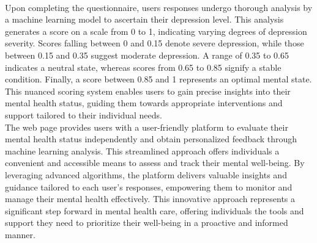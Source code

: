\\
Upon completing the questionnaire, users responses undergo thorough analysis by a machine learning model to ascertain their depression level. This analysis generates a score on a scale from 0 to 1, indicating varying degrees of depression severity. Scores falling between 0 and 0.15 denote severe depression, while those between 0.15 and 0.35 suggest moderate depression. A range of 0.35 to 0.65 indicates a neutral state, whereas scores from 0.65 to 0.85 signify a stable condition. Finally, a score between 0.85 and 1 represents an optimal mental state. This nuanced scoring system enables users to gain precise insights into their mental health status, guiding them towards appropriate interventions and support tailored to their individual needs.
\\
The web page provides users with a user-friendly platform to evaluate their mental health status independently and obtain personalized feedback through machine learning analysis. This streamlined approach offers individuals a convenient and accessible means to assess and track their mental well-being. By leveraging advanced algorithms, the platform delivers valuable insights and guidance tailored to each user's responses, empowering them to monitor and manage their mental health effectively. This innovative approach represents a significant step forward in mental health care, offering individuals the tools and support they need to prioritize their well-being in a proactive and informed manner.
\\
\pagebreak
